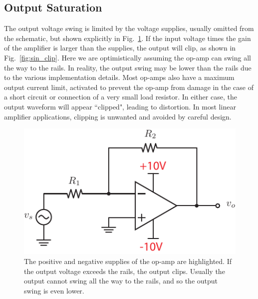 \subsection{Output Saturation}
The output voltage swing is limited by the voltage supplies, usually omitted from the schematic, but shown explicitly in Fig.~\ref{fig:opamp_invert_gain_supplies}.  If the input voltage times the gain of the amplifier is larger than the supplies, the output will clip, as shown in Fig.~\ref{fig:sin_clip}.  Here we are optimistically assuming the op-amp can swing all the way to the rails.  In reality, the output swing may be lower than the rails due to the various implementation details.  Most op-amps also have a maximum output current limit, activated to prevent the op-amp from damage in the case of a short circuit or connection of a very small load resistor.  In either case, the output waveform will appear ``clipped", leading to distortion.  In most linear amplifier applications, clipping is unwanted and avoided by careful design.
\begin{figure}[tb]
\begin{center}
\includegraphics[scale=1]{opamp_invert_gain_supplies}
\end{center}
\caption{The positive and negative supplies of the op-amp are highlighted.  If the output voltage exceeds the rails, the output clips.  Usually the output cannot swing all the way to the rails, and so the output swing is even lower.}
\label{fig:opamp_invert_gain_supplies}
\end{figure}
